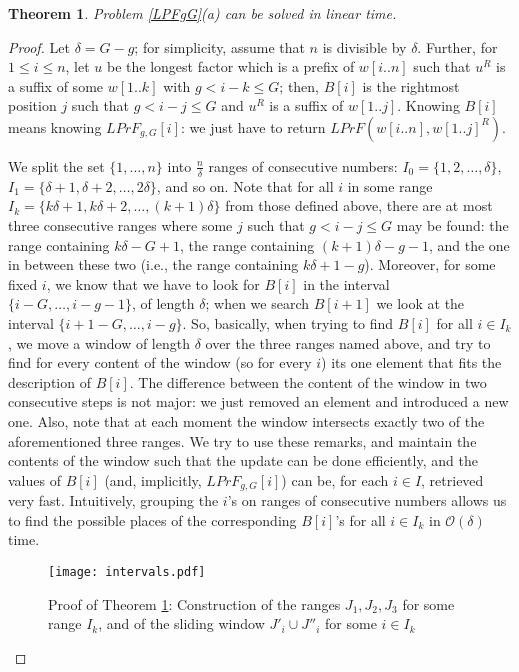\documentclass[final]{dmtcs-episciences}
\newcommand{\bigo}{{\mathcal O}}
\newcommand{\LPF}{{\mathit{LPrF}}}
\newtheorem{theorem}{Theorem}
\begin{document}
\begin{theorem}\label{thLPrFgG}
Problem \ref{LPFgG}(a) can be solved in linear time.
\end{theorem}
\begin{proof}
Let $\delta=G-g$; for simplicity, assume that $n$ is divisible by $\delta$. Further, for $1\leq i\leq n$, 
let $u$ be the longest factor which is a prefix of $w[i..n]$ such that $u^R$ is a suffix of some $w[1..k]$ with $g< i-k \leq G$; then, $B[i]$ is the rightmost position $j$ such that $g< i-j\leq G$ and $u^R$ is a suffix of $w[1..j]$. Knowing $B[i]$ means knowing $\LPF_{g,G}[i]$: we just have to return $\LPF(w[i..n],w[1..j]^R)$. 

We split the set $\{1,\ldots,n\}$ into $\frac{n}{\delta}$ ranges of consecutive numbers: $I_0=\{1,2,\ldots,\delta\}$, $I_1=\{\delta+1, \delta+2,\ldots, 2\delta\}$, and so on. Note that for all $i$ in some range $I_k=\{k\delta+1,k\delta+2,\ldots,(k+1)\delta\}$ from those defined above, there are at most three consecutive ranges where some $j$ such that $g< i-j\leq G$ may be found: the range containing $k\delta-G+1$, the range containing $(k+1)\delta-g-1$, and the one in between these two (i.e., the range containing $k\delta+1-g$). Moreover, for some fixed $i$, we know that we have to look for $B[i]$ in the interval $\{i-G,\ldots,i-g-1\}$, of length $\delta$; when we search $B[i+1]$ we look at the interval $\{i+1-G,\ldots,i-g\}$. So, basically, when trying to find $B[i]$ for all $i\in I_k$, we move a window of length $\delta$ over the three ranges named above, and try to find for every content of the window (so for every $i$) its one element that fits the description of $B[i]$. The difference between the content of the window in two consecutive steps is not major: we just removed an element and introduced a new one. Also, note that at each moment the window intersects exactly two of the aforementioned three ranges. We try to use these remarks, and maintain the contents of the window such that the update can be done efficiently, and the values of $B[i]$ (and, implicitly, $\LPF_{g,G}[i]$) can be, for each $i\in I$, retrieved very fast. Intuitively, grouping the $i$'s on ranges of consecutive numbers allows us to find the possible places of the corresponding $B[i]$'s for all $i\in I_k$ in $\bigo(\delta)$ time.

\begin{figure}[H]
\begin{center}
\texttt{[image: intervals.pdf]}
\end{center}
\vspace{-1cm}
\caption{Proof of Theorem \ref{thLPrFgG}: Construction of the ranges $J_1,J_2,J_3$ for some range $I_k$, and of the sliding window $J'_i\cup J''_i$ for some $i\in I_k$}
\end{figure}


\end{proof}
\end{document}

